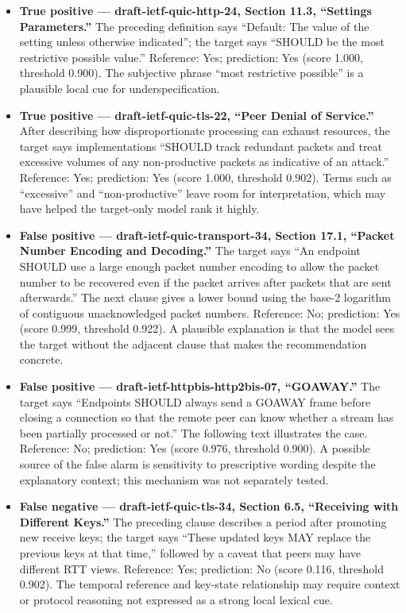 \documentclass[12pt,a4paper,oneside]{report}
\begin{document}
\begin{itemize}[leftmargin=*]
  \item \textbf{True positive --- draft-ietf-quic-http-24, Section 11.3, ``Settings Parameters.''} The preceding definition says ``Default: The value of the setting unless otherwise indicated''; the target says ``SHOULD be the most restrictive possible value.'' Reference: Yes; prediction: Yes (score 1.000, threshold 0.900). The subjective phrase ``most restrictive possible'' is a plausible local cue for underspecification.
  \item \textbf{True positive --- draft-ietf-quic-tls-22, ``Peer Denial of Service.''} After describing how disproportionate processing can exhaust resources, the target says implementations ``SHOULD track redundant packets and treat excessive volumes of any non-productive packets as indicative of an attack.'' Reference: Yes; prediction: Yes (score 1.000, threshold 0.902). Terms such as ``excessive'' and ``non-productive'' leave room for interpretation, which may have helped the target-only model rank it highly.
  \item \textbf{False positive --- draft-ietf-quic-transport-34, Section 17.1, ``Packet Number Encoding and Decoding.''} The target says ``An endpoint SHOULD use a large enough packet number encoding to allow the packet number to be recovered even if the packet arrives after packets that are sent afterwards.'' The next clause gives a lower bound using the base-2 logarithm of contiguous unacknowledged packet numbers. Reference: No; prediction: Yes (score 0.999, threshold 0.922). A plausible explanation is that the model sees the target without the adjacent clause that makes the recommendation concrete.
  \item \textbf{False positive --- draft-ietf-httpbis-http2bis-07, ``GOAWAY.''} The target says ``Endpoints SHOULD always send a GOAWAY frame before closing a connection so that the remote peer can know whether a stream has been partially processed or not.'' The following text illustrates the case. Reference: No; prediction: Yes (score 0.976, threshold 0.900). A possible source of the false alarm is sensitivity to prescriptive wording despite the explanatory context; this mechanism was not separately tested.
  \item \textbf{False negative --- draft-ietf-quic-tls-34, Section 6.5, ``Receiving with Different Keys.''} The preceding clause describes a period after promoting new receive keys; the target says ``These updated keys MAY replace the previous keys at that time,'' followed by a caveat that peers may have different RTT views. Reference: Yes; prediction: No (score 0.116, threshold 0.902). The temporal reference and key-state relationship may require context or protocol reasoning not expressed as a strong local lexical cue.

\end{itemize}
\end{document}
